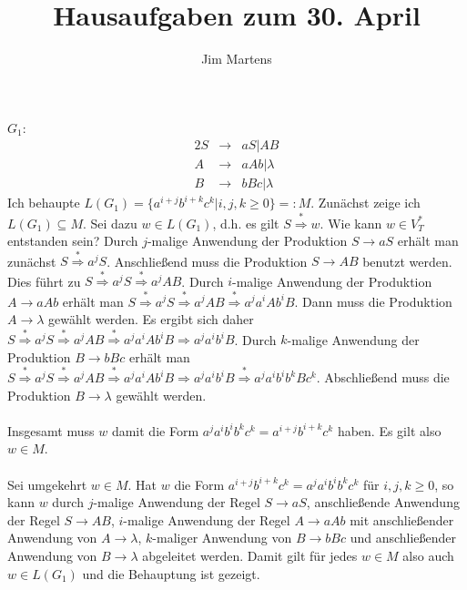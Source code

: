 \documentclass[10pt,a4paper,oneside,ngerman,numbers=noenddot]{scrartcl}
\begin{document}
\author{Jim Martens}
\title{Hausaufgaben zum 30. April}
\maketitle
\section{} %
\subsection{} %
$G_{1}$:\\
\begin{alignat*}{2}
S &\rightarrow & aS | AB  \\
A &\rightarrow & aAb | \lambda \\
B &\rightarrow & bBc | \lambda
\end{alignat*}
Ich behaupte $L(G_{1}) = \{a^{i + j}b^{i + k}c^{k}|i,j,k \geq 0\} =: M$.
Zunächst zeige ich $L(G_{1}) \subseteq M$. Sei dazu $w \in L(G_{1})$, d.h. es gilt $S \overset{*}{\Longrightarrow} w$. Wie kann $w \in V_{T}^{*}$ entstanden sein? Durch $j$-malige Anwendung der Produktion $S \rightarrow aS$ erhält man zunächst $S \overset{*}{\Longrightarrow} a^{j}S$. Anschließend muss die Produktion $S \rightarrow AB$ benutzt werden. Dies führt zu $S \overset{*}{\Longrightarrow} a^{j}S \overset{*}{\Longrightarrow} a^{j}AB$. Durch $i$-malige Anwendung der Produktion $A \rightarrow aAb$ erhält man $S \overset{*}{\Longrightarrow} a^{j}S \overset{*}{\Longrightarrow} a^{j}AB \overset{*}{\Longrightarrow} a^{j}a^{i}Ab^{i}B$. Dann muss die Produktion $A \rightarrow \lambda$ gewählt werden. Es ergibt sich daher 
$S \overset{*}{\Longrightarrow} a^{j}S \overset{*}{\Longrightarrow} a^{j}AB \overset{*}{\Longrightarrow} a^{j}a^{i}Ab^{i}B \Longrightarrow a^{j}a^{i}b^{i}B$. Durch $k$-malige Anwendung der Produktion $B \rightarrow  bBc$ erhält man $S \overset{*}{\Longrightarrow} a^{j}S \overset{*}{\Longrightarrow} a^{j}AB \overset{*}{\Longrightarrow} a^{j}a^{i}Ab^{i}B \Longrightarrow a^{j}a^{i}b^{i}B \overset{*}{\Longrightarrow} a^{j}a^{i}b^{i}b^{k}Bc^{k}$. Abschließend muss die Produktion $B \rightarrow \lambda$ gewählt werden.\\
\\
Insgesamt muss $w$ damit die Form $a^{j}a^{i}b^{i}b^{k}c^{k} = a^{i + j}b^{i + k}c^{k}$ haben. Es gilt also $w \in M$.\\
\\
Sei umgekehrt $w \in M$. Hat $w$ die Form $a^{i + j}b^{i + k}c^{k} = a^{j}a^{i}b^{i}b^{k}c^{k}$ für $i,j,k \geq 0$, so kann $w$ durch $j$-malige Anwendung der Regel $S \rightarrow aS$, anschließende Anwendung der Regel $S \rightarrow AB$, $i$-malige Anwendung der Regel $A \rightarrow aAb$ mit anschließender Anwendung von $A \rightarrow \lambda$, $k$-maliger Anwendung von $B \rightarrow bBc$ und anschließender Anwendung von $B \rightarrow \lambda$ abgeleitet werden. Damit gilt für jedes $w \in M$ also auch $w \in L(G_{1})$ und die Behauptung ist gezeigt.
\end{document}
